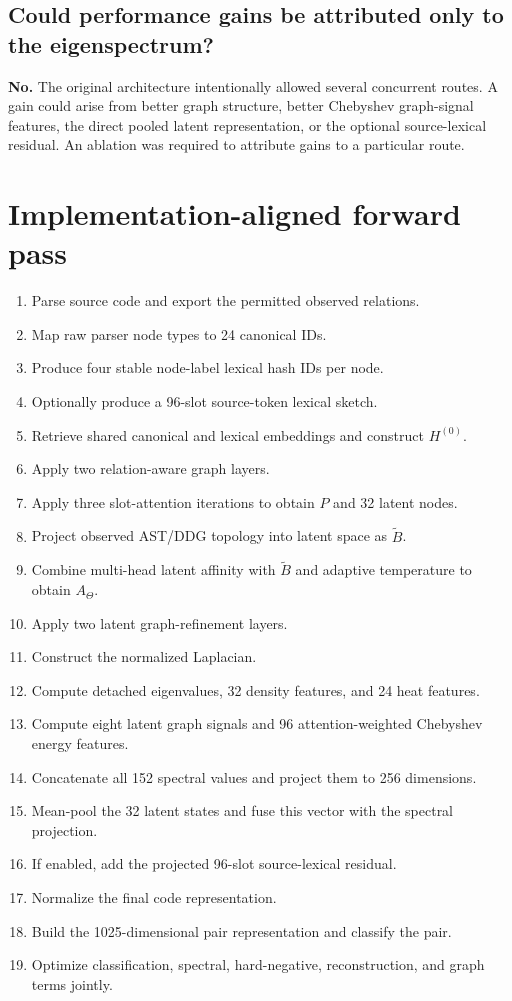 \documentclass[11pt,a4paper]{article}
\begin{document}
\subsection{Could performance gains be attributed only to the eigenspectrum?}

\textbf{No.} The original architecture intentionally allowed several concurrent
routes. A gain could arise from better graph structure, better Chebyshev
graph-signal features, the direct pooled latent representation, or the optional
source-lexical residual. An ablation was required to attribute gains to a
particular route.

\section{Implementation-aligned forward pass}

\begin{enumerate}[label=\textbf{Step \arabic*:}]
\item Parse source code and export the permitted observed relations.
\item Map raw parser node types to 24 canonical IDs.
\item Produce four stable node-label lexical hash IDs per node.
\item Optionally produce a 96-slot source-token lexical sketch.
\item Retrieve shared canonical and lexical embeddings and construct $H^{(0)}$.
\item Apply two relation-aware graph layers.
\item Apply three slot-attention iterations to obtain $P$ and 32 latent nodes.
\item Project observed AST/DDG topology into latent space as $\widetilde B$.
\item Combine multi-head latent affinity with $\widetilde B$ and adaptive
temperature to obtain $A_\Theta$.
\item Apply two latent graph-refinement layers.
\item Construct the normalized Laplacian.
\item Compute detached eigenvalues, 32 density features, and 24 heat features.
\item Compute eight latent graph signals and 96 attention-weighted Chebyshev
energy features.
\item Concatenate all 152 spectral values and project them to 256 dimensions.
\item Mean-pool the 32 latent states and fuse this vector with the spectral
projection.
\item If enabled, add the projected 96-slot source-lexical residual.
\item Normalize the final code representation.
\item Build the 1025-dimensional pair representation and classify the pair.
\item Optimize classification, spectral, hard-negative, reconstruction, and
graph terms jointly.
\end{enumerate}
\end{document}
